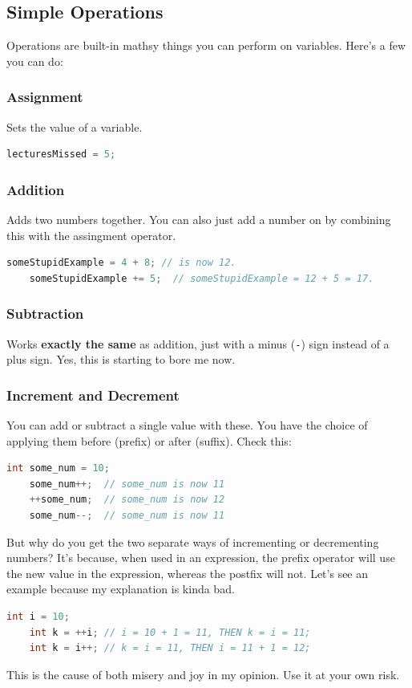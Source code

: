 \subsection{Simple Operations}
Operations are built-in mathsy things you can perform on variables. Here's a few you can do:
\subsubsection{Assignment}
Sets the value of a variable.
\begin{lstlisting}[language=C]
    lecturesMissed = 5;
\end{lstlisting}

\subsubsection{Addition}
Adds two numbers together. You can also just add a number on by combining this with the assingment operator.
\begin{lstlisting}[language=C]
    someStupidExample = 4 + 8; // is now 12.
    someStupidExample += 5;  // someStupidExample = 12 + 5 = 17.
\end{lstlisting}

\subsubsection{Subtraction}
Works \textbf{exactly the same} as addition, just with a minus (\texttt{-}) sign instead of a plus sign. Yes, this is starting to bore me now.

\subsubsection{Increment and Decrement}
You can add or subtract a single value with these. You have the choice of applying them before (prefix) or after (suffix). Check this:
\begin{lstlisting}[language=C]
    int some_num = 10;
    some_num++;  // some_num is now 11
    ++some_num;  // some_num is now 12
    some_num--;  // some_num is now 11
\end{lstlisting}

But why do you get the two separate ways of incrementing or decrementing numbers? It's because, when used in an expression, the prefix operator will use the new value in the expression, whereas the postfix will not. Let's see an example because my explanation is kinda bad.
\begin{lstlisting}[language=C]
    int i = 10;
    int k = ++i; // i = 10 + 1 = 11, THEN k = i = 11;
    int k = i++; // k = i = 11, THEN i = 11 + 1 = 12;
\end{lstlisting}
This is the cause of both misery and joy in my opinion. Use it at your own risk.

